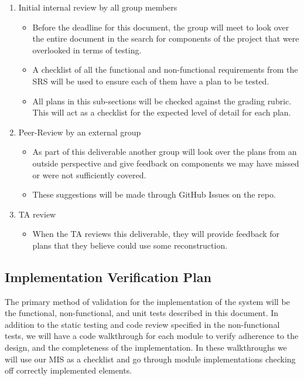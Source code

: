 \documentclass[12pt, titlepage]{article}
\begin{document}
\begin{enumerate}
  \item Initial internal review by all group members
        \begin{itemize}
          \item Before the deadline for this document, the group will meet to look over the entire document in the search for components of the project that were overlooked in terms of testing.
          \item A checklist of all the functional and non-functional requirements from the SRS will be used to ensure each of them have a plan to be tested.
          \item All plans in this sub-sections will be checked against the grading rubric. This will act as a checklist for the expected level of detail for each plan.
        \end{itemize}
  \item Peer-Review by an external group
        \begin{itemize}
          \item As part of this deliverable another group will look over the plans from an outside perspective and give feedback on components we may have missed or were not sufficiently covered.
          \item These suggestions will be made through GitHub Issues on the repo.
        \end{itemize}
  \item TA review
        \begin{itemize}
          \item When the TA reviews this deliverable, they will provide feedback for plans that they believe could use some reconstruction.
        \end{itemize}
\end{enumerate}



\subsection{Implementation Verification Plan}

The primary method of validation for the implementation of the system will be the functional, non-functional, and unit tests described in this document. In addition to the static testing and code review specified in the non-functional tests, we will have a code walkthrough for each module to verify adherence to the design, and the completeness of the implementation. In these walkthroughs we will use our MIS as a checklist and go through module implementations checking off correctly implemented elements.
\end{document}

